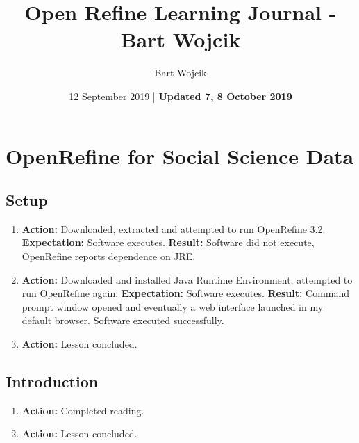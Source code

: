 \documentclass{article}
\title{Open Refine Learning Journal   - Bart Wojcik}
\author{Bart Wojcik}
\date{12 September 2019 | \textbf{Updated 7, 8 October 2019}}
\begin{document}
\maketitle

\section{OpenRefine for Social Science Data}
\subsection{Setup}
\begin{enumerate}
    \item \textbf{Action: }Downloaded, extracted and attempted to run OpenRefine 3.2.
    \subitem \textbf{Expectation: }Software executes. 
    \subitem \textbf{Result: }Software did not execute, OpenRefine reports dependence on JRE.
    \item \textbf{Action: }Downloaded and installed Java Runtime Environment, attempted to run OpenRefine again. 
    \subitem \textbf{Expectation: }Software executes.
    \subitem \textbf{Result: }Command prompt window opened and eventually a web interface launched in my default browser. Software executed successfully.
    \item \textbf{Action: }Lesson concluded.
\end{enumerate}
\subsection{Introduction}
\begin{enumerate}
    \item \textbf{Action: }Completed reading.
    \item \textbf{Action: }Lesson concluded.
\end{enumerate}
\end{document}
